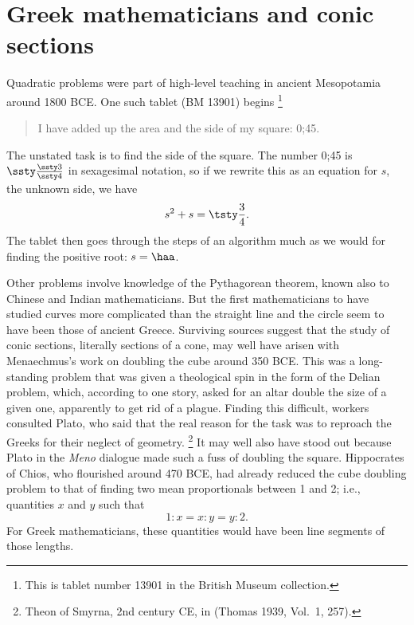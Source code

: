 \section{Greek mathematicians and conic sections}

Quadratic problems were part of high-level teaching in ancient
Mesopotamia
%
around 1800 BCE. One such tablet (BM 13901) begins%
%
\footnote{This is
tablet number 13901 in the British Museum collection.}
\begin{quote}
I have added up the area and the side of my square: 0;45.
\end{quote}
The unstated task is to find the side of the square.
The number 0;45 is $\ssty\frac{\ssty3}{\ssty4}$ in sexagesimal notation,
so if we rewrite this as an equation for $s$, the unknown side, we have
$$s^2 + s = \tsty\frac{3}{4}.$$
The tablet then goes through the steps of an algorithm much as we would
for finding the positive root: $s = \haa$.

Other problems involve knowledge of the Pythagorean
%
theorem, known also
to Chinese and Indian mathematicians. But the first mathematicians to
have studied curves more complicated than the straight line and the
circle seem to have been those of ancient Greece.  Surviving sources
suggest that the study of conic sections,
%
%
literally sections of a cone,
may well have arisen with Menaechmus's
%
work on doubling the
%
cube around
350 BCE. This was a long-standing problem that was given a theological
spin in the form of the Delian problem, which, according to one story,
asked for an altar double the size of a given one, apparently to get
rid of a plague. Finding this difficult, workers consulted Plato, who
said that the real reason for the task was to reproach the Greeks for
their neglect of geometry.%
%
\footnote{Theon of Smyrna, 
%
2nd century CE, in (Thomas 1939, Vol.\ 1, 257).}
%
It may well also have stood out because Plato
%
in the \emph{Meno}
dialogue made such a fuss of doubling the square. Hippocrates of
Chios,
%
who flourished around 470 BCE,  had already reduced the
cube doubling
problem to that of finding two mean proportionals between 1 and 2;
i.e., quantities $x$ and $y$ such that
\begin{equation}\label{Menmus}
1:x= x:y = y: 2.
\tag{$*$}
\end{equation}
For Greek mathematicians, these quantities would have been line segments
of those lengths.

